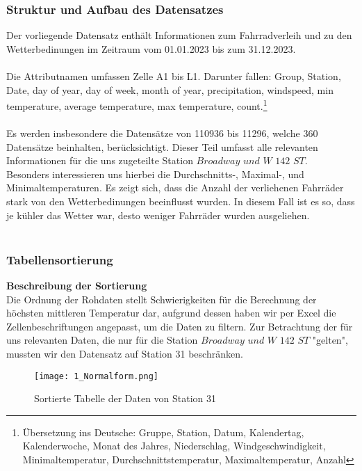 \documentclass[a4paper,12pt]{article}
\begin{document}
\subsubsection{Struktur und Aufbau des Datensatzes}
Der vorliegende Datensatz enthält Informationen zum Fahrradverleih und zu den Wetterbedinungen im Zeitraum vom 01.01.2023 bis zum 31.12.2023.
\\
\\ Die Attributnamen umfassen Zelle A1 bis L1. Darunter fallen: Group, Station, Date, day of year, day of week, month of year, precipitation, windspeed, min temperature, average temperature, max temperature, count.\footnote{Übersetzung ins Deutsche: Gruppe, Station, Datum, Kalendertag, Kalenderwoche, Monat des Jahres, Niederschlag, Windgeschwindigkeit, Minimaltemperatur, Durchschnittstemperatur, Maximaltemperatur, Anzahl}
\\
\\ Es werden insbesondere die Datensätze von 110936 bis 11296, welche 360 Datensätze beinhalten, berücksichtigt. Dieser Teil umfasst alle relevanten Informationen für die uns zugeteilte Station $Broadway$ $und$ $W$ $142$ $ST$. \\Besonders interessieren uns hierbei die Durchschnitts-, Maximal-, und Minimaltemperaturen. Es zeigt sich, dass die Anzahl der verliehenen Fahrräder stark von den Wetterbedinungen beeinflusst wurden. In diesem Fall ist es so, dass je kühler das Wetter war, desto weniger Fahrräder wurden ausgeliehen.
\\
\\ 


\subsubsection{Tabellensortierung}

    
\textbf{Beschreibung der Sortierung}
\\Die Ordnung der Rohdaten stellt Schwierigkeiten für die Berechnung der höchsten mittleren Temperatur dar, aufgrund dessen haben wir per Excel die Zellenbeschriftungen angepasst, um die Daten zu filtern. 
Zur Betrachtung der für uns relevanten Daten, die nur für die Station $Broadway$ $und$ $W$ $142$ $ST$ "gelten", mussten wir den Datensatz auf Station 31 beschränken.






\begin{figure}[h]
    \centering 
    \texttt{[image: 1\_Normalform.png]}
    \caption{Sortierte Tabelle der Daten von Station 31}
    \label{fig:normalform1}
\end{figure}
\end{document}
